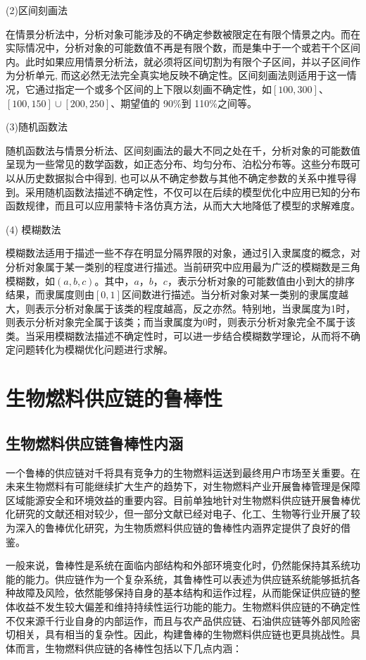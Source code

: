 (2)区间刻画法

在情景分析法中，分析对象可能涉及的不确定参数被限定在有限个情景之内。而在实际情况中，分析对象的可能数值不再是有限个数，而是集中于一个或若干个区间内。此时如果应用情景分析法，就必须将区间切割为有限个子区间，并以子区间作为分析单元\cite{Osmani2014}, 而这必然无法完全真实地反映不确定性。区间刻画法则适用于这一情况，它通过指定一个或多个区间的上下限以刻画不确定性，如$[100,300]$、$[100,150]\cup[200,250]$、期望值的 90\%到 110\%之间\cite{Balaman2014}等。

(3)随机函数法

随机函数法与情景分析法、区间刻画法的最大不同之处在千，分析对象的可能数值呈现为一些常见的数学函数，如正态分布\cite{Osmani2014}、均匀分布、泊松分布等。这些分布既可以从历史数据拟合中得到\cite{Giarola2012}, 也可以从不确定参数与其他不确定参数的关系中推导得到。采用随机函数法描述不确定性，不仅可以在后续的模型优化中应用已知的分布函数规律，而且可以应用蒙特卡洛仿真方法，从而大大地降低了模型的求解难度。

(4)	模糊数法

模糊数法适用于描述一些不存在明显分隔界限的对象，通过引入隶属度的概念，对分析对象属于某一类别的程度进行描述。当前研究中应用最为广泛的模糊数是三角模糊数，如$(a,b,c)$。其中，$a$，$b$，$c$，表示分析对象的可能数值由小到大的排序结果，而隶属度则由$[0,1]$区间数进行描述。当分析对象对某一类别的隶属度越大，则表示分析对象属于该类的程度越高，反之亦然。特别地，当隶属度为1时，则表示分析对象完全属于该类；而当隶属度为0时，则表示分析对象完全不属于该类。当采用模糊数法描述不确定性时，可以进一步结合模糊数学理论，从而将不确定问题转化为模糊优化问题进行求解。

\section{生物燃料供应链的鲁棒性}
\subsection{生物燃料供应链鲁棒性内涵}
一个鲁棒的供应链对千将具有竞争力的生物燃料运送到最终用户市场至关重要\cite{Awudu2012}。在未来生物燃料有可能继续扩大生产的趋势下，对生物燃料产业开展鲁棒管理是保障区域能源安全和环境效益的重要内容\cite{Langholtz2014}。目前单独地针对生物燃料供应链开展鲁棒优化研究的文献还相对较少，但一部分文献已经对电子、化工、生物等行业开展了较为深入的鲁棒优化研究，为生物质燃料供应链的鲁棒性内涵界定提供了良好的借鉴。

一般来说，鲁棒性是系统在面临内部结构和外部环境变化时，仍然能保持其系统功能的能力\cite{deng2009}。供应链作为一个复杂系统，其鲁棒性可以表述为供应链系统能够抵抗各种故障及风险，依然能够保持自身的基本结构和运作过程，从而能保证供应链的整体收益不发生较大偏差和维持持续性运行功能的能力\cite{唐莉莉2011}。生物燃料供应链的不确定性不仅来源千行业自身的内部运作，而且与农产品供应链、石油供应链等外部风险密切相关，具有相当的复杂性。因此，构建鲁棒的生物燃料供应链也更具挑战性。具体而言，生物燃料供应链的各棒性包括以下几点内涵：

